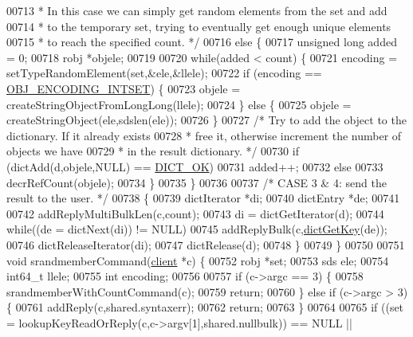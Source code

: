 \begin{DoxyCode}
00713 \textcolor{comment}{     * In this case we can simply get random elements from the set and add}
00714 \textcolor{comment}{     * to the temporary set, trying to eventually get enough unique elements}
00715 \textcolor{comment}{     * to reach the specified count. */}
00716     \textcolor{keywordflow}{else} \{
00717         \textcolor{keywordtype}{unsigned} \textcolor{keywordtype}{long} added = 0;
00718         robj *objele;
00719 
00720         \textcolor{keywordflow}{while}(added < count) \{
00721             encoding = setTypeRandomElement(set,&ele,&llele);
00722             \textcolor{keywordflow}{if} (encoding == \hyperlink{server_8h_a214173987de21c3b7661fddd42b05873}{OBJ\_ENCODING\_INTSET}) \{
00723                 objele = createStringObjectFromLongLong(llele);
00724             \} \textcolor{keywordflow}{else} \{
00725                 objele = createStringObject(ele,sdslen(ele));
00726             \}
00727             \textcolor{comment}{/* Try to add the object to the dictionary. If it already exists}
00728 \textcolor{comment}{             * free it, otherwise increment the number of objects we have}
00729 \textcolor{comment}{             * in the result dictionary. */}
00730             \textcolor{keywordflow}{if} (dictAdd(d,objele,NULL) == \hyperlink{dict_8h_a2afecbeab8f7efbc183048f52f6d17e5}{DICT\_OK})
00731                 added++;
00732             \textcolor{keywordflow}{else}
00733                 decrRefCount(objele);
00734         \}
00735     \}
00736 
00737     \textcolor{comment}{/* CASE 3 & 4: send the result to the user. */}
00738     \{
00739         dictIterator *di;
00740         dictEntry *de;
00741 
00742         addReplyMultiBulkLen(c,count);
00743         di = dictGetIterator(d);
00744         \textcolor{keywordflow}{while}((de = dictNext(di)) != NULL)
00745             addReplyBulk(c,\hyperlink{dict_8h_a3271c334309904a3086deca94f96e46e}{dictGetKey}(de));
00746         dictReleaseIterator(di);
00747         dictRelease(d);
00748     \}
00749 \}
00750 
00751 \textcolor{keywordtype}{void} srandmemberCommand(\hyperlink{structclient}{client} *c) \{
00752     robj *set;
00753     sds ele;
00754     int64\_t llele;
00755     \textcolor{keywordtype}{int} encoding;
00756 
00757     \textcolor{keywordflow}{if} (c->argc == 3) \{
00758         srandmemberWithCountCommand(c);
00759         \textcolor{keywordflow}{return};
00760     \} \textcolor{keywordflow}{else} \textcolor{keywordflow}{if} (c->argc > 3) \{
00761         addReply(c,shared.syntaxerr);
00762         \textcolor{keywordflow}{return};
00763     \}
00764 
00765     \textcolor{keywordflow}{if} ((set = lookupKeyReadOrReply(c,c->argv[1],shared.nullbulk)) == NULL ||

\end{DoxyCode}
